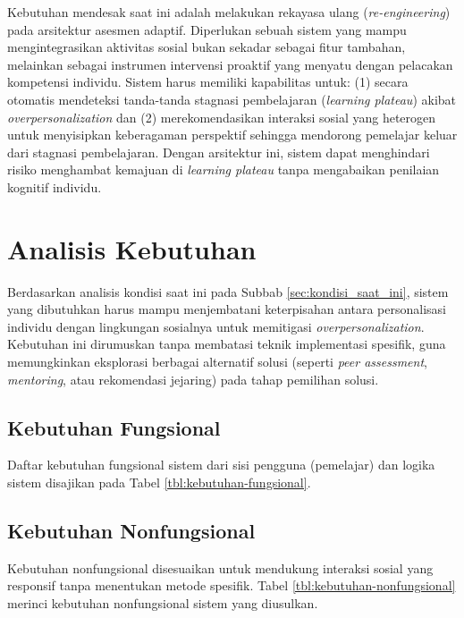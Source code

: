 Kebutuhan mendesak saat ini adalah melakukan rekayasa ulang (\textit{re-engineering}) pada arsitektur asesmen adaptif. Diperlukan sebuah sistem yang mampu mengintegrasikan aktivitas sosial bukan sekadar sebagai fitur tambahan, melainkan sebagai instrumen intervensi proaktif yang menyatu dengan pelacakan kompetensi individu. Sistem harus memiliki kapabilitas untuk: (1) secara otomatis mendeteksi tanda-tanda stagnasi pembelajaran (\textit{learning plateau}) akibat \textit{overpersonalization} dan (2) merekomendasikan interaksi sosial yang heterogen untuk menyisipkan keberagaman perspektif sehingga mendorong pemelajar keluar dari stagnasi pembelajaran. Dengan arsitektur ini, sistem dapat menghindari risiko menghambat kemajuan di \textit{learning plateau} tanpa mengabaikan penilaian kognitif individu.

\section{Analisis Kebutuhan}
\label{sec:analisis_kebutuhan}

Berdasarkan analisis kondisi saat ini pada Subbab \ref{sec:kondisi_saat_ini}, sistem yang dibutuhkan harus mampu menjembatani keterpisahan antara personalisasi individu dengan lingkungan sosialnya untuk memitigasi \textit{overpersonalization}. Kebutuhan ini dirumuskan tanpa membatasi teknik implementasi spesifik, guna memungkinkan eksplorasi berbagai alternatif solusi (seperti \textit{peer assessment}, \textit{mentoring}, atau rekomendasi jejaring) pada tahap pemilihan solusi.

\subsection{Kebutuhan Fungsional}
\label{ssec:kebutuhan_fungsional}
Daftar kebutuhan fungsional sistem dari sisi pengguna (pemelajar) dan logika sistem disajikan pada Tabel \ref{tbl:kebutuhan-fungsional}.



\subsection{Kebutuhan Nonfungsional}
\label{ssec:kebutuhan_nonfungsional}
Kebutuhan nonfungsional disesuaikan untuk mendukung interaksi sosial yang responsif tanpa menentukan metode spesifik.
Tabel \ref{tbl:kebutuhan-nonfungsional} merinci kebutuhan nonfungsional sistem yang diusulkan.



